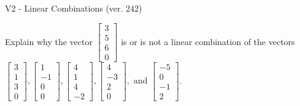 \begin{exercise}
  \begin{exerciseTitle}V2 - Linear Combinations (ver. 242)\end{exerciseTitle}
  \begin{exerciseStatement}
    Explain why the vector \(\left[\begin{array}{c}
3 \\
5 \\
6 \\
0
\end{array}\right]\)  is or is not a linear 
	combination of the vectors \(\left[\begin{array}{c}
3 \\
1 \\
3 \\
0
\end{array}\right] , \left[\begin{array}{c}
1 \\
-1 \\
0 \\
0
\end{array}\right] , \left[\begin{array}{c}
4 \\
1 \\
4 \\
-2
\end{array}\right] , \left[\begin{array}{c}
4 \\
-3 \\
2 \\
0
\end{array}\right] , \text{ and } \left[\begin{array}{c}
-5 \\
0 \\
-1 \\
2
\end{array}\right]\).
	



\end{exerciseStatement}
\end{exercise}

